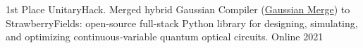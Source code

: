 

\begin{cvhonors}

  \cvhonor
    {1st Place} %
    {UnitaryHack. Merged hybrid Gaussian Compiler (\href{https://github.com/XanaduAI/strawberryfields/pull/591}{Gaussian Merge}) to StrawberryFields: open-source full-stack Python library for designing, simulating, and optimizing continuous-variable quantum optical circuits. } %
    {Online} %
    {2021} %

%
%
%
%
%
%
\end{cvhonors}





